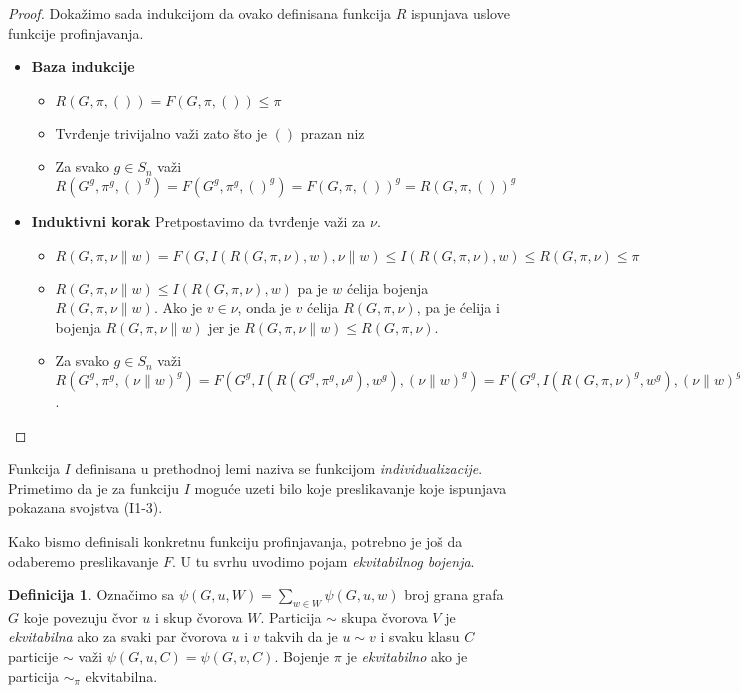 \documentclass[12pt,oneside]{memoir}
\theoremstyle{definition}
\newtheorem*{definition}{Definicija}
\begin{document}
\begin{proof}
	  Dokažimo sada indukcijom da ovako definisana funkcija $R$ ispunjava
	  uslove funkcije profinjavanja.
	  \begin{itemize}
		  \item[] \textbf{Baza indukcije} 
			  \begin{itemize}
				  \item[(R1)] $R(G, \pi, ()) = F(G, \pi, ()) \leq \pi$
				  \item[(R2)] Tvrđenje trivijalno važi zato što je $()$ prazan niz
				  \item[(R3)] Za svako $g \in S_n$ važi $R(G^g, \pi^g, ()^g) = F(G^g,
					  \pi^g, ()^g) = F(G, \pi, ())^g = R(G, \pi, ())^g$
			  \end{itemize}
		  \item[] \textbf{Induktivni korak} Pretpostavimo da tvrđenje važi za $\nu$.
			  \begin{itemize}
				  \item[(R1)] $R(G, \pi, \nu \| w) = F(G, I(R(G, \pi, \nu), w),
					  \nu \| w) \leq I(R(G, \pi, \nu), w) \leq R(G, \pi, \nu)
					  \leq \pi$
				  \item[(R2)] $R(G, \pi, \nu \| w) \leq I(R(G, \pi, \nu), w)$
					  pa je ${w}$ ćelija bojenja $R(G, \pi, \nu \| w)$. Ako je
					  $v \in \nu$, onda je ${v}$ ćelija $R(G, \pi, \nu)$, pa je
					  ćelija i bojenja $R(G, \pi, \nu \| w)$ jer je $R(G, \pi,
					  \nu \| w) \leq R(G, \pi, \nu)$.
				  \item[(R3)] Za svako $g \in S_n$ važi $R(G^g, \pi^g, (\nu \|
					  w)^g) = F(G^g, I(R(G^g, \pi^g, \nu^g), w^g), (\nu \|
					  w)^g) = F(G^g, I(R(G, \pi, \nu)^g, w^g), (\nu \| w)^g) =
					  F(G^g, I(R(G, \pi, \nu), w)^g, (\nu \| w)^g) = F(G,
					  I(R(G, \pi, \nu), w), (\nu \| w))^g = R(G, \pi, \nu \|
					  w)^g$.
			  \end{itemize}
	  \end{itemize}
  \end{proof}

  Funkcija $I$ definisana u prethodnoj lemi naziva se funkcijom
  \emph{individualizacije}. Primetimo da je za funkciju $I$ moguće uzeti bilo
  koje preslikavanje koje ispunjava pokazana svojstva (I1-3).

  Kako bismo definisali konkretnu funkciju profinjavanja, potrebno je još da
  odaberemo preslikavanje $F$. U tu svrhu uvodimo pojam \emph{ekvitabilnog
  bojenja}.

  \begin{definition}
	  Označimo sa $\psi(G, u, W) = \sum_{w \in W} \psi(G, u, w)$ broj grana
	  grafa $G$ koje povezuju čvor $u$ i skup čvorova $W$.  Particija $\sim$
	  skupa čvorova $V$ je \emph{ekvitabilna} ako za svaki par čvorova $u$ i
	  $v$ takvih da je $u \sim v$ i svaku klasu $C$ particije $\sim$ važi
	  $\psi(G, u, C) = \psi(G, v, C)$.  Bojenje $\pi$ je \emph{ekvitabilno} ako
	  je particija $\sim_\pi$ ekvitabilna.
  \end{definition}
\end{document}
